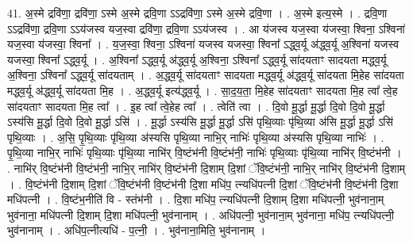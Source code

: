 \documentclass[17pt]{extarticle}
\begin{document}
41. अ॒स्मे द्रवि॑णा॒ द्रवि॑णा॒ ऽस्मे अ॒स्मे द्रवि॒णा ऽऽद्रवि॑णा॒ ऽस्मे अ॒स्मे द्रवि॒णा । . अ॒स्मे इत्य॒स्मे । . द्रवि॒णा ऽऽद्रवि॑णा॒ द्रवि॒णा ऽऽय॑जस्व यज॒स्वा द्रवि॑णा॒ द्रवि॒णा ऽऽय॑जस्व । . आ य॑जस्व यज॒स्वा य॑जस्वा॒ श्विना॒ ऽश्विना॑ यज॒स्वा य॑जस्वा॒ श्विना᳚ । . य॒ज॒स्वा॒ श्विना॒ ऽश्विना॑ यजस्व यजस्वा॒ श्विना᳚ ऽद्ध्व॒र्यू अ॑द्ध्व॒र्यू अ॒श्विना॑ यजस्व यजस्वा॒ श्विना᳚ ऽद्ध्व॒र्यू । . अ॒श्विना᳚ ऽद्ध्व॒र्यू अ॑द्ध्व॒र्यू अ॒श्विना॒ ऽश्विना᳚ ऽद्ध्व॒र्यू सा॑दयताꣳ सादयता मद्ध्व॒र्यू अ॒श्विना॒ ऽश्विना᳚ ऽद्ध्व॒र्यू सा॑दयताम् । . अ॒द्ध्व॒र्यू सा॑दयताꣳ सादयता मद्ध्व॒र्यू अ॑द्ध्व॒र्यू सा॑दयता मि॒हेह सा॑दयता मद्ध्व॒र्यू अ॑द्ध्व॒र्यू सा॑दयता मि॒ह । . अ॒द्ध्व॒र्यू इत्य॑द्ध्व॒र्यू । . सा॒द॒य॒ता॒ मि॒हेह सा॑दयताꣳ सादयता मि॒ह त्वा᳚ त्वे॒ह सा॑दयताꣳ सादयता मि॒ह त्वा᳚ । . इ॒ह त्वा᳚ त्वे॒हेह त्वा᳚ । . त्वेति॑ त्वा । . दि॒वो मू॒र्द्धा मू॒र्द्धा दि॒वो दि॒वो मू॒र्द्धा ऽस्य॑सि मू॒र्द्धा दि॒वो दि॒वो मू॒र्द्धा ऽसि॑ । . मू॒र्द्धा ऽस्य॑सि मू॒र्द्धा मू॒र्द्धा ऽसि॑ पृथि॒व्याः पृ॑थि॒व्या अ॑सि मू॒र्द्धा मू॒र्द्धा ऽसि॑ पृथि॒व्याः । . अ॒सि॒ पृ॒थि॒व्याः पृ॑थि॒व्या अ॑स्यसि पृथि॒व्या नाभि॒र् नाभिः॑ पृथि॒व्या अ॑स्यसि पृथि॒व्या नाभिः॑ । . पृ॒थि॒व्या नाभि॒र् नाभिः॑ पृथि॒व्याः पृ॑थि॒व्या नाभि॑र् वि॒ष्टंभ॑नी वि॒ष्टंभ॑नी॒ नाभिः॑ पृथि॒व्याः पृ॑थि॒व्या नाभि॑र् वि॒ष्टंभ॑नी । . नाभि॑र् वि॒ष्टंभ॑नी वि॒ष्टंभ॑नी॒ नाभि॒र् नाभि॑र् वि॒ष्टंभ॑नी दि॒शाम् दि॒शां ॅवि॒ष्टंभ॑नी॒ नाभि॒र् नाभि॑र् वि॒ष्टंभ॑नी दि॒शाम् । . वि॒ष्टंभ॑नी दि॒शाम् दि॒शां ॅवि॒ष्टंभ॑नी वि॒ष्टंभ॑नी दि॒शा मधि॑प॒ त्न्यधि॑पत्नी दि॒शां ॅवि॒ष्टंभ॑नी वि॒ष्टंभ॑नी दि॒शा मधि॑पत्नी । . वि॒ष्टंभ॒नीति॑ वि - स्तंभ॑नी । . दि॒शा मधि॑प॒ त्न्यधि॑पत्नी दि॒शाम् दि॒शा मधि॑पत्नी॒ भुव॑नाना॒म् भुव॑नाना॒ मधि॑पत्नी दि॒शाम् दि॒शा मधि॑पत्नी॒ भुव॑नानाम् । . अधि॑पत्नी॒ भुव॑नाना॒म् भुव॑नाना॒ मधि॑प॒ त्न्यधि॑पत्नी॒ भुव॑नानाम् । . अधि॑प॒त्नीत्यधि॑ - प॒त्नी॒ । . भुव॑नाना॒मिति॒ भुव॑नानाम् । \newline
\pagebreak
{}
\end{document}
